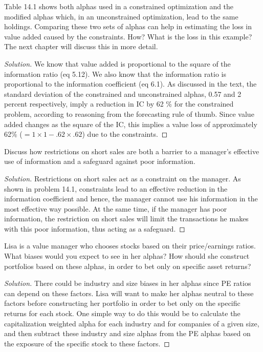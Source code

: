 \begin{problem}{14.1}
  Table 14.1 shows both alphas used in a constrained optimization and the modified alphas which, in an unconstrained optimization, lead to the same holdings. Comparing these two sets of alphas can help in estimating the loss in value added caused by the constraints. How? What is the loss in this example? The next chapter will discuss this in more detail.
\end{problem}

\begin{proof}[Solution]
  We know that value added is proportional to the square of the information ratio (eq 5.12). We also know that the information ratio is proportional to the information coefficient (eq 6.1). As discussed in the text, the standard deviation of the constrained and unconstrained alphas, 0.57 and 2 percent respectively, imply a reduction in IC by 62 \% for the constrained problem, according to reasoning from the forecasting rule of thumb. Since value added changes as the square of the IC, this implies a value loss of approximately 62\% ($=1\times 1-.62\times.62$) due to the constraints. 
\end{proof}

\begin{problem}{14.2}
  Discuss how restrictions on short sales are both a barrier to a manager's effective use of information and a safeguard against poor information.
\end{problem}

\begin{proof}[Solution]
  Restrictions on short sales act as a constraint on the manager. As shown in problem 14.1, constraints lead to an effective reduction in the information coefficient and hence, the manager cannot use his information in the most effective way possible. At the same time, if the manager has poor information, the restriction on short sales will limit the transactions he makes with this poor information, thus acting as a safeguard.
\end{proof}

\begin{problem}{14.3}
  Lisa is a value manager who chooses stocks based on their price/earnings ratios. What biases would you expect to see in her alphas? How should she construct portfolios based on these alphas, in order to bet only on specific asset returns?
\end{problem}

\begin{proof}[Solution]
  There could be industry and size biases in her alphas since PE ratios can depend on these factors. Lisa will want to make her alphas neutral to these factors before constructing her portfolio in order to bet only on the specific returns for each stock. One simple way to do this would be to calculate the capitalization weighted alpha for each industry and for companies of a given size, and then subtract these industry and size alphas from the PE alphas based on the exposure of the specific stock to these factors.
\end{proof}


